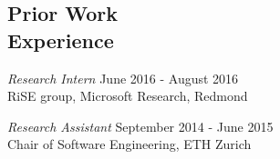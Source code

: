 \documentclass[margin, 10pt]{res} %
\begin{document}
\begin{resume}
\section{Prior Work \\ Experience}
{\sl Research Intern} \hfill June 2016 - August 2016 \\
RiSE group, Microsoft Research, Redmond
%

{\sl Research Assistant} \hfill September 2014 - June 2015 \\
Chair of Software Engineering, ETH Zurich


\end{resume}
\end{document}
